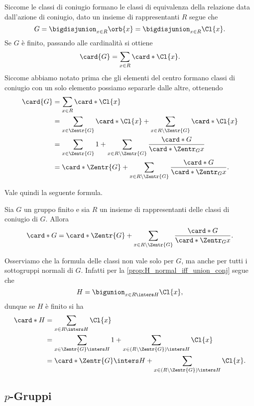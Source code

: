 Siccome le classi di coniugio formano le classi di equivalenza della relazione data dall'azione di coniugio, dato un insieme di rappresentanti $R$ segue che \[
    G = \bigdisjunion_{x \in R} \orb{x} = \bigdisjunion_{x \in R} \Cl{x}.
\] Se $G$ è finito, passando alle cardinalità si ottiene \[
    \card{G} = \sum_{x \in R} \card*{\Cl{x}}. 
\] Siccome abbiamo notato prima che gli elementi del centro formano classi di coniugio con un solo elemento possiamo separarle dalle altre, ottenendo
\begin{align*}
    \card{G} &= \sum_{x \in R} \card*{\Cl{x}}\\
    &= \sum_{x \in \Zentr{G}} \card*{\Cl{x}} + \sum_{x \in R \setminus \Zentr{G}} \card*{\Cl{x}}\\
    &= \sum_{x \in \Zentr{G}} 1 + \sum_{x \in R \setminus \Zentr{G}} \frac{\card*{G}}{\card*{\Zentr_{G}{x}}}\\
    &= \card*{\Zentr{G}} + \sum_{x \in R \setminus \Zentr{G}} \frac{\card*{G}}{\card*{\Zentr_{G}{x}}}.
\end{align*}

Vale quindi la seguente formula.
\begin{theorem}
    Sia $G$ un gruppo finito e sia $R$ un insieme di rappresentanti delle classi di coniugio di $G$.
    Allora \begin{equation}
        \label{eq:class_formula}
        \card*{G} = \card*{\Zentr{G}} + \sum_{x \in R \setminus \Zentr{G}} \frac{\card*{G}}{\card*{\Zentr_{G}{x}}}.
    \end{equation}
\end{theorem}

Osserviamo che la formula delle classi non vale solo per $G$, ma anche per tutti i sottogruppi normali di $G$. Infatti per la \autoref{prop:H_normal_iff_union_conj} segue che \[
    H = \bigunion_{x \in R \inters H} \Cl{x},    
\] dunque se $H$ è finito si ha \begin{align*}
    \card*{H} &= \sum_{x \in R \inters H} \Cl{x}\\
    &= \sum_{x \in \Zentr{G} \inters H} 1 + \sum_{{x \in (R \setminus \Zentr{G}) \inters H}} \Cl{x}\\
    &= \card*{\Zentr{G} \inters H} + \sum_{{x \in (R \setminus \Zentr{G}) \inters H}} \Cl{x}. 
\end{align*}

\subsection{$p$-Gruppi}


